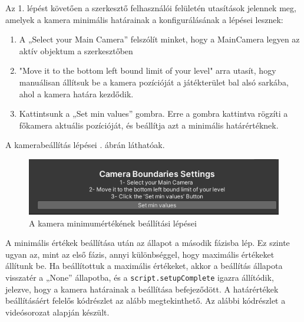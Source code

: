Az 1. lépést követően a szerkesztő felhasználói felületén utasítások jelennek meg, amelyek a kamera minimális határainak a konfigurálásának a lépései lesznek:
\begin{enumerate}
\item A „Select your Main Camera” felszólít minket, hogy a MainCamera legyen az aktív objektum a szerkesztőben
\item "Move it to the bottom left bound limit of your level" arra utasít, hogy manuálisan állítsuk be a kamera pozícióját a játékterület bal alsó sarkába, ahol a kamera határa kezdődik.
\item Kattintsunk a „Set min values” gombra. Erre a gombra kattintva rögzíti a főkamera aktuális pozícióját, és beállítja azt a minimális határértéknek.
\end{enumerate}
A kamerabeállítás lépései . ábrán láthatóak.

\begin{figure}[ht]
\centering
\includegraphics[scale = 0.7]{images/camerasteps.png}
\caption{A kamera minimumértékének beállítási lépései}
\label{fig:camerasteps}
\end{figure}

A minimális értékek beállítása után az állapot a második fázisba lép. Ez szinte ugyan az, mint az első fázis, annyi különbséggel, hogy maximális értékeket állítunk be. Ha beállítottuk a maximális értékeket, akkor a beállítás állapota visszatér a „None” állapotba, és a \texttt{script.setupComplete} igazra állítódik, jelezve, hogy a kamera határainak a beállítása befejeződött. A határértékek beállításáért felelős kódrészlet az alább megtekinthető. Az alábbi kódrészlet a \cite{youtubeplaylist} videósorozat alapján készült.

